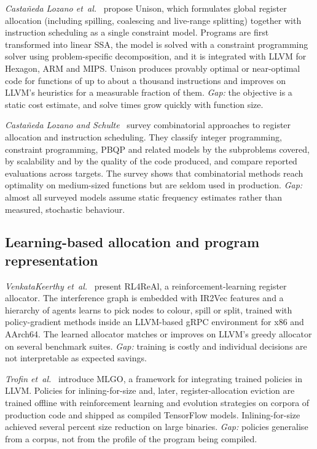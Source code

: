 \documentclass{ieeeaccess}
\begin{document}
\textit{Castañeda Lozano et~al.}~\cite{lozano2019toplas} propose Unison,
which formulates global register allocation (including spilling,
coalescing and live-range splitting) together with instruction
scheduling as a single constraint model. Programs are first transformed
into linear SSA, the model is solved with a constraint programming
solver using problem-specific decomposition, and it is integrated with
LLVM for Hexagon, ARM and MIPS. Unison produces provably optimal or
near-optimal code for functions of up to about a thousand instructions
and improves on LLVM's heuristics for a measurable fraction of them.
\textit{Gap:} the objective is a static cost estimate, and solve times
grow quickly with function size.

\textit{Castañeda Lozano and Schulte}~\cite{lozano2019survey} survey
combinatorial approaches to register allocation and instruction
scheduling. They classify integer programming, constraint programming,
PBQP and related models by the subproblems covered, by scalability and
by the quality of the code produced, and compare reported evaluations
across targets. The survey shows that combinatorial methods reach
optimality on medium-sized functions but are seldom used in production.
\textit{Gap:} almost all surveyed models assume static frequency
estimates rather than measured, stochastic behaviour.

\subsection{Learning-based allocation and program representation}

\textit{VenkataKeerthy et~al.}~\cite{venkatakeerthy2023rl4real} present
RL4ReAl, a reinforcement-learning register allocator. The interference
graph is embedded with IR2Vec features and a hierarchy of agents learns
to pick nodes to colour, spill or split, trained with policy-gradient
methods inside an LLVM-based gRPC environment for x86 and AArch64. The
learned allocator matches or improves on LLVM's greedy allocator on
several benchmark suites. \textit{Gap:} training is costly and
individual decisions are not interpretable as expected savings.

\textit{Trofin et~al.}~\cite{trofin2021mlgo} introduce MLGO, a framework
for integrating trained policies in LLVM. Policies for inlining-for-size
and, later, register-allocation eviction are trained offline with
reinforcement learning and evolution strategies on corpora of production
code and shipped as compiled TensorFlow models. Inlining-for-size
achieved several percent size reduction on large binaries.
\textit{Gap:} policies generalise from a corpus, not from the profile of
the program being compiled.
\end{document}
